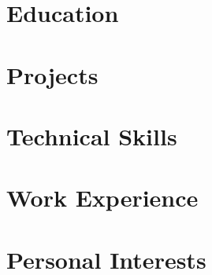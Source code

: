 \documentclass{mycv}
\author{Nicholas Todoroff}
\begin{document}
\maketitle

\part{Education}
    
\part{Projects}
    
\part{Technical Skills}
    
\part{Work Experience}
    
\part{Personal Interests}
    
\end{document}

